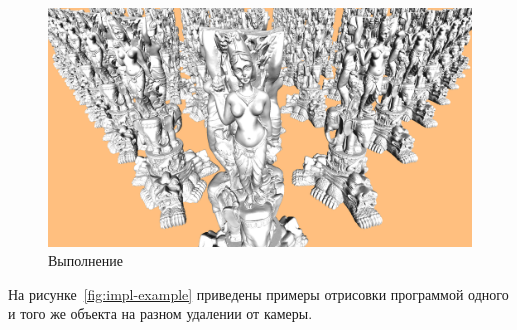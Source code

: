 \begin{figure}[H]
    \includegraphics[width=\textwidth]{pics/comparison-cluster.png}
    \caption{Выполнение}
    \label{fig:execution-example}
\end{figure}

На рисунке~\ref{fig:impl-example} приведены примеры отрисовки программой одного и того же объекта на разном удалении от камеры.


